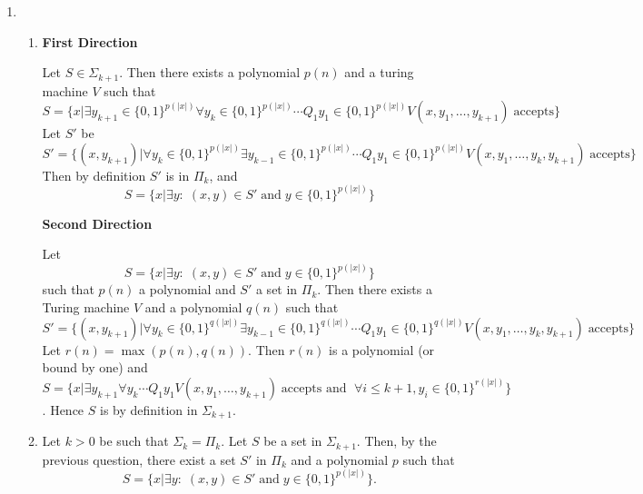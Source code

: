 \documentclass[11pt]{article} \usepackage{amssymb}
\begin{document}
\begin{enumerate}
\begin{enumerate}
    \end{enumerate}
    

  \item
    \begin{enumerate}
    \item 
      {\bf First Direction}

      Let $S\in\Sigma_{k+1}$. Then there exists a polynomial $p(n)$ and a
      turing machine $V$ such that
      \begin{equation*}
        S=\{x|\exists y_{k+1}\in\{0,1\}^{p(|x|)}\forall y_k\in\{0,1\}^{p(|x|)}\cdots Q_1y_1\in\{0,1\}^{p(|x|)}V(x,y_1,\ldots,y_{k+1}) \;\mbox{accepts}\}
      \end{equation*}
      Let $S'$ be
      \begin{equation*}
        S'=\{(x,y_{k+1})|\forall y_k\in\{0,1\}^{p(|x|)}\exists y_{k-1}\in\{0,1\}^{p(|x|)}\cdots Q_1y_1\in\{0,1\}^{p(|x|)}V(x,y_1,\ldots,y_k,y_{k+1}) \;\mbox{accepts}\}
      \end{equation*}
      Then by definition $S'$ is in $\Pi_k$, and 
      \begin{equation*}
        S=\{x|\exists y:\; (x,y)\in S'\;\mbox{and}\;y\in\{0,1\}^{p(|x|)}\}
      \end{equation*}
      
      {\bf Second Direction}
      
      Let 
      \begin{equation*}
        S=\{x|\exists y:\; (x,y)\in S'\;\mbox{and}\;y\in\{0,1\}^{p(|x|)}\}
      \end{equation*}
      such that $p(n)$ a polynomial and $S'$ a set in $\Pi_k$. Then there exists
      a Turing machine $V$ and a polynomial $q(n)$ such that
      \begin{equation*}
        S'=\{(x,y_{k+1})|\forall y_k\in\{0,1\}^{q(|x|)}\exists y_{k-1}\in\{0,1\}^{q(|x|)}\cdots Q_1y_1\in\{0,1\}^{q(|x|)}V(x,y_1,\ldots,y_k,y_{k+1}) \;\mbox{accepts}\}
      \end{equation*}
      Let $r(n)=\max(p(n),q(n))$. Then $r(n)$ is a polynomial (or bound by one) and
      \begin{equation*}
        S=\{x|\exists y_{k+1}\forall y_k\cdots Q_1y_1V(x,y_1,\ldots,y_{k+1}) \;\mbox{accepts and }\; \forall i\leq k+1, y_i\in\{0,1\}^{r(|x|)}\}
      \end{equation*}.
      Hence $S$ is by definition in $\Sigma_{k+1}$.

    \item
      Let $k>0$ be such that $\Sigma_k=\Pi_k$. Let $S$ be a set in $\Sigma_{k+1}$. Then,
      by the previous question,
      there exist a set $S'$ in $\Pi_k$ and a polynomial  $p$
      such that 
      \begin{equation*}
        S=\{x|\exists y:\; (x,y)\in S'\;\mbox{and}\;y\in\{0,1\}^{p(|x|)}\}.
      \end{equation*}
      

\end{enumerate}
\end{enumerate}
\end{document}
